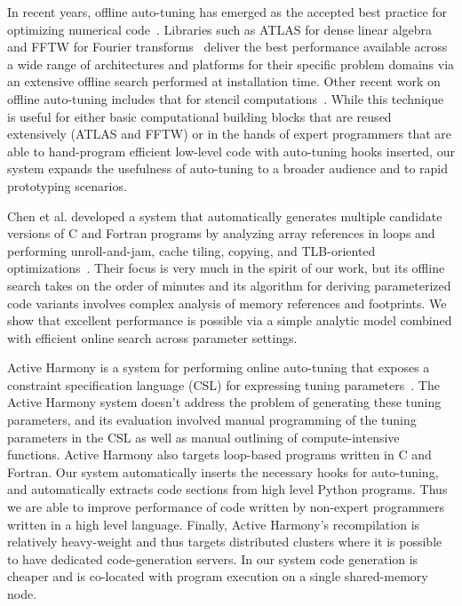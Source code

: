 \documentclass[preprint,9pt]{sigplanconf}
\begin{document}
In recent years, offline auto-tuning has emerged as the accepted best practice for optimizing numerical code~\cite{Asan06}.  Libraries such as ATLAS for dense linear algebra~\cite{Whal00} and FFTW for Fourier transforms~\cite{Frig05} deliver the best performance available across a wide range of architectures and platforms for their specific problem domains via an extensive offline search performed at installation time.  Other recent work on offline auto-tuning includes that for stencil computations~\cite{Kami10,Datt08}.  While this technique is useful for either basic computational building blocks that are reused extensively (ATLAS and FFTW) or in the hands of expert programmers that are able to hand-program efficient low-level code with auto-tuning hooks inserted, our system expands the usefulness of auto-tuning to a broader audience and to rapid prototyping scenarios.

Chen et al. developed a system that automatically generates multiple candidate versions of C and Fortran programs by analyzing array references in loops and performing unroll-and-jam, cache tiling, copying, and TLB-oriented optimizations~\cite{Chen05b}.  Their focus is very much in the spirit of our work, but its offline search takes on the order of minutes and its algorithm for deriving parameterized code variants involves complex analysis of memory references and footprints.  We show that excellent performance is possible via a simple analytic model combined with efficient online search across parameter settings.

Active Harmony is a system for performing online auto-tuning that exposes a constraint specification language (CSL) for expressing tuning parameters~\cite{Tiwa11}.  The Active Harmony system doesn't address the problem of generating these tuning parameters, and its evaluation involved manual programming of the tuning parameters in the CSL as well as manual outlining of compute-intensive functions.  Active Harmony also targets loop-based programs written in C and Fortran.  Our system automatically inserts the necessary hooks for auto-tuning, and automatically extracts code sections from high level Python programs.  Thus we are able to improve performance of code written by non-expert programmers written in a high level language.  Finally, Active Harmony's recompilation is relatively heavy-weight and thus targets distributed clusters where it is possible to have dedicated code-generation servers.  In our system code generation is cheaper and is co-located with program execution on a single shared-memory node.
\end{document}
